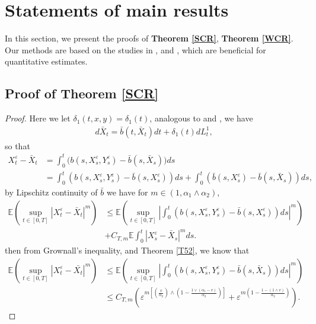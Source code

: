 \documentclass[11pt,reqno]{amsart}
\numberwithin{equation}{section}
\begin{document}
\section{Statements of main results}\label{main}

In this section, we present the proofs of \textbf{Theorem  \ref{SCR}}, \textbf{Theorem  \ref{WCR}}. Our methods are based on the studies in \cite{CEB}, \cite[Section 4]{SXX} and \cite[Section 7]{KY}, which are beneficial for quantitative estimates.


\subsection{Proof of \textbf{Theorem \ref{SCR}} }
\begin{proof}
Here we let $\delta_{1}(t,x,y)=\delta_{1}(t)$,  analogous to \cite[356, Section 4.1]{SXX} and \cite[Section 7.1]{KY}, we have 
\begin{align*}
	d\bar{X}_{t}=\bar{b}(t,\bar{X}_{t})dt+\delta_{1}(t)dL_{t}^{1},
\end{align*}
so that
\begin{align*}
	X_{t}^{\varepsilon}-\bar{X}_{t}&=\int_{0}^{t}\big( b(s,X_{s}^{\varepsilon},Y_{s}^{\varepsilon})-\bar{b}(s,\bar{X}_{s})\big)ds\\
	&=\int_{0}^{t}\left( b(s,X_{s}^{\varepsilon},Y_{s}^{\varepsilon})-\bar{b}(s,X_{s}^{\varepsilon})\right)ds+\int_{0}^{t}\left( \bar b(s,X_{s}^{\varepsilon})-\bar{b}(s,\bar{X}_{s})\right)ds,
\end{align*}
by Lipschitz continuity of $\bar{b}$ we have for $m\in(1,\alpha_{1}\wedge\alpha_{2})$,
\begin{equation}
	\begin{split}
		\mathbb{E}\left( \sup_{t\in [0,T]}|X_{t}^{\varepsilon}-\bar{X}_{t}|^{m}\right)	&\leq\mathbb{E}\left( \sup_{t\in [0,T]}\left| \int_{0}^{t}\left( b(s,X_{s}^{\varepsilon},Y_{s}^{\varepsilon})-\bar{b}(s,X_{s}^{\varepsilon})\right) ds\right| ^{m}\right)\\
		&+  C_{T,m}\mathbb{E}\int_{0}^{t}|X_{s}^{\varepsilon}-\bar{X}_{s}|^{m}ds.
	\end{split}\nonumber
\end{equation}
then  from Grownall's inequality, 
and Theorem \ref{T52}, we know that 
\begin{align*}
\mathbb{E}\left( \sup_{t\in [0,T]}|X_{t}^{\varepsilon}-\bar{X_{t}}|^{m}\right)	
&\leq\mathbb{E}\left( \sup_{t\in [0,T]}\left| \int_{0}^{t}\left( b(s,X_{s}^{\varepsilon},Y_{s}^{\varepsilon})-\bar{b}(s,\bar{X}_{s})\right) ds\right| ^{m}\right)\\
&\leq  C_{T,m}\left(\varepsilon^{m\left[ \left( \frac{v}{\alpha_{2}}\right) \wedge \left( 1-\frac{1\vee(\alpha_{1}-v)}{\alpha_{2}}\right) \right] }+\varepsilon^{m(1-\frac{1-(1\wedge v)}{\alpha_{2}})}\right).
\end{align*}
\end{proof}
\end{document}
